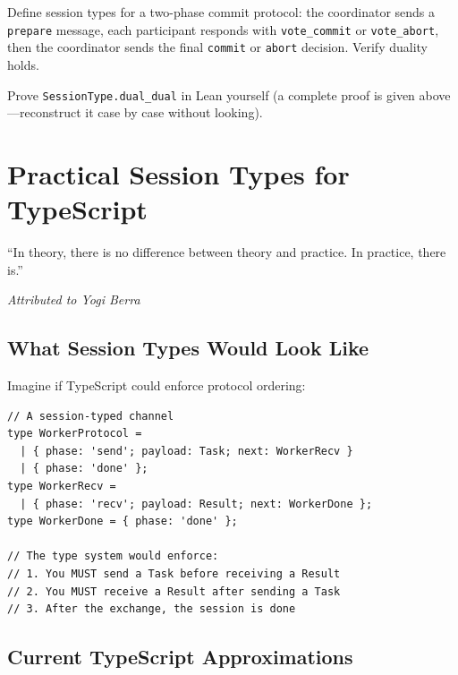 \documentclass[11pt, a4paper, oneside]{book}
\newcommand{\lc}[1]{\texttt{#1}}
\newcounter{exercise}[chapter]
\begin{document}
\begin{exercisebox}[title={Exercise 9.1}]
Define session types for a two-phase commit protocol: the coordinator sends a
\lc{prepare} message, each participant responds with \lc{vote\_commit} or
\lc{vote\_abort}, then the coordinator sends the final \lc{commit} or
\lc{abort} decision. Verify duality holds.
\end{exercisebox}

\begin{exercisebox}[title={Exercise 9.2}]
Prove \lc{SessionType.dual\_dual} in Lean yourself (a complete proof is given
above---reconstruct it case by case without looking).
\end{exercisebox}

\chapter{Practical Session Types for TypeScript}

\epigraph{``In theory, there is no difference between theory and practice. In
practice, there is.''}{\textit{Attributed to Yogi Berra}}

\section{What Session Types Would Look Like}

Imagine if TypeScript could enforce protocol ordering:

\begin{tsbox}
\begin{verbatim}
// A session-typed channel
type WorkerProtocol =
  | { phase: 'send'; payload: Task; next: WorkerRecv }
  | { phase: 'done' };
type WorkerRecv =
  | { phase: 'recv'; payload: Result; next: WorkerDone };
type WorkerDone = { phase: 'done' };

// The type system would enforce:
// 1. You MUST send a Task before receiving a Result
// 2. You MUST receive a Result after sending a Task
// 3. After the exchange, the session is done
\end{verbatim}
\end{tsbox}

\section{Current TypeScript Approximations}
\end{document}
